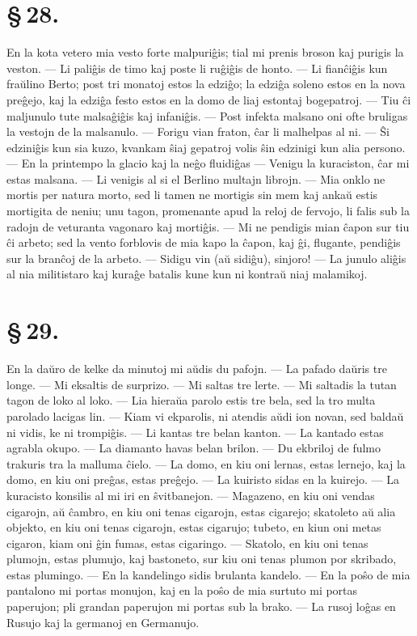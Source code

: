 \section*{\S\,28.}
En la kota vetero mia vesto forte malpuri\^gis; tial mi prenis
broson kaj purigis la veston. --- Li pali\^gis de timo kaj poste li
ru\^gi\^gis de honto. --- Li fian\^ci\^gis kun fra\u ulino Berto;
post tri monatoj estos la edzi\^go; la edzi\^ga soleno estos en la
nova pre\^gejo, kaj la edzi\^ga festo estos en la domo de liaj
estontaj bogepatroj. --- Tiu \^ci maljunulo tute malsa\^gi\^gis kaj
infani\^gis. --- Post infekta malsano oni ofte bruligas la vestojn
de la malsanulo. --- Forigu vian fraton, \^car li malhelpas al ni.
--- \^Si edzini\^gis kun sia kuzo, kvankam \^siaj gepatroj volis
\^sin edzinigi kun alia persono. --- En la printempo la glacio kaj
la ne\^go fluidi\^gas --- Venigu la kuraciston, \^car mi estas
malsana. --- Li venigis al si el Berlino multajn librojn. --- Mia
onklo ne mortis per natura morto, sed li tamen ne mortigis sin mem
kaj anka\u u estis mortigita de neniu; unu tagon, promenante apud la
reloj de fervojo, li falis sub la radojn de veturanta vagonaro kaj
morti\^gis. --- Mi ne pendigis mian \^capon sur tiu \^ci arbeto; sed
la vento forblovis de mia kapo la \^capon, kaj \^gi, flugante,
pendi\^gis sur la bran\^coj de la arbeto. --- Sidigu vin (a\u u
sidi\^gu), sinjoro! --- La junulo ali\^gis al nia militistaro kaj
kura\^ge batalis kune kun ni kontra\u u niaj malamikoj.


\section*{\S\,29.}
En la da\u uro de kelke da minutoj mi a\u udis du pafojn. --- La
pafado da\u uris tre longe. --- Mi eksaltis de surprizo. --- Mi
saltas tre lerte. --- Mi saltadis la tutan tagon de loko al loko.
--- Lia hiera\u ua parolo estis tre bela, sed la tro multa parolado
lacigas lin. --- Kiam vi ekparolis, ni atendis a\u udi ion novan,
sed balda\u u ni vidis, ke ni trompi\^gis. --- Li kantas tre belan
kanton. --- La kantado estas agrabla okupo. --- La diamanto havas
belan brilon. --- Du ekbriloj de fulmo trakuris tra la malluma
\^cielo. --- La domo, en kiu oni lernas, estas lernejo, kaj la domo,
en kiu oni pre\^gas, estas pre\^gejo. --- La kuiristo sidas en la
kuirejo. --- La kuracisto konsilis al mi iri en \^svitbanejon.
 --- Magazeno, en kiu oni vendas cigarojn, a\u u \^cambro, en kiu oni
tenas cigarojn, estas cigarejo; skatoleto a\u u alia objekto, en kiu
oni tenas cigarojn, estas cigarujo; tubeto, en kiun oni metas
cigaron, kiam oni \^gin fumas, estas cigaringo. --- Skatolo, en kiu
oni tenas plumojn, estas plumujo, kaj bastoneto, sur kiu oni tenas
plumon por skribado, estas plumingo. --- En la kandelingo sidis
brulanta kandelo. --- En la po\^so de mia pantalono mi portas
monujon, kaj en la po\^so de mia surtuto mi portas paperujon; pli
grandan paperujon mi portas sub la brako. --- La rusoj lo\^gas en
Rusujo kaj la germanoj en Germanujo.


